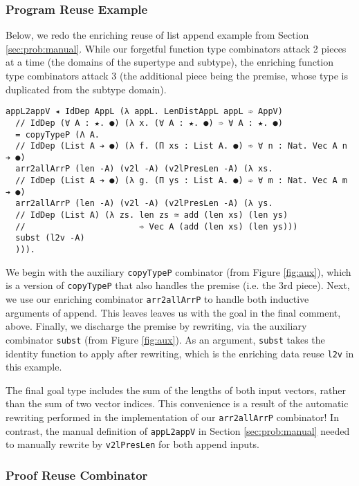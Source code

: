 \documentclass[acmsmall]{acmart}\settopmatter{}
\newcommand{\refsec}[1]{Section \ref{sec:#1}}
\newcommand{\reffig}[1]{Figure \ref{fig:#1}}
\begin{document}
\subsubsection{Program Reuse Example}

Below, we redo the enriching reuse of list append example from
\refsec{prob:manual}. While our forgetful function type combinators
attack 2 pieces at a time (the domains of the supertype and subtype),
the enriching function type combinators attack 3 (the additional piece
being the premise, whose type is duplicated from the subtype domain).

\begin{verbatim}
appL2appV ◂ IdDep AppL (λ appL. LenDistAppL appL ➾ AppV)
  // IdDep (∀ A : ★. ●) (λ x. (∀ A : ★. ●) ➾ ∀ A : ★. ●)
  = copyTypeP (Λ A.
  // IdDep (List A ➔ ●) (λ f. (Π xs : List A. ●) ➾ ∀ n : Nat. Vec A n ➔ ●)
  arr2allArrP (len -A) (v2l -A) (v2lPresLen -A) (λ xs.
  // IdDep (List A ➔ ●) (λ g. (Π ys : List A. ●) ➾ ∀ m : Nat. Vec A m ➔ ●)
  arr2allArrP (len -A) (v2l -A) (v2lPresLen -A) (λ ys.
  // IdDep (List A) (λ zs. len zs ≃ add (len xs) (len ys)
  //                       ➾ Vec A (add (len xs) (len ys)))
  subst (l2v -A)
  ))).
\end{verbatim}

We begin with the auxiliary \verb;copyTypeP; combinator
(from \reffig{aux}), which is a version of \verb;copyTypeP; that also handles
the premise (i.e. the 3rd piece). Next, we use our enriching
combinator \verb;arr2allArrP; to handle both inductive arguments of
append. This leaves leaves us with the goal in the final comment,
above. Finally, we discharge the premise by rewriting, via the auxiliary
combinator \verb;subst; (from \reffig{aux}). As an argument,
\verb;subst; takes the identity function to apply after rewriting,
which is the enriching data reuse \verb;l2v; in this example.

The final goal type includes the sum of the lengths of both input
vectors, rather than the sum of two vector indices.
This convenience is a result
of the automatic rewriting performed in the implementation of our
\verb;arr2allArrP; combinator! In contrast, the manual definition of
\verb;appL2appV; in \refsec{prob:manual} needed to manually rewrite
by \verb;v2lPresLen; for both append inputs.

\subsubsection{Proof Reuse Combinator}
\end{document}
